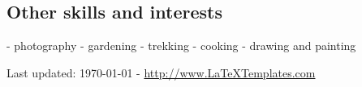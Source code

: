 \documentclass[11pt, a4paper]{article} %
\begin{document}
\subsection*{Other skills and interests}
- photography
- gardening
- trekking
- cooking
- drawing and painting

\vfill{} %


\begin{center}
{\scriptsize Last updated: \today\- - \href{http://www.LaTeXTemplates.com}{http://www.LaTeXTemplates.com}} %
\end{center}

\end{document}
